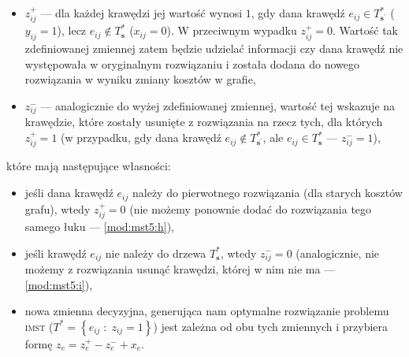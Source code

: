 \begin{itemize}
	\item $z_{ij}^{+}$ --- dla każdej krawędzi jej wartość wynosi $1$, gdy dana krawędź $e_{ij} \in T^{\ast}_{\textbf{s}^{\prime}}$ ($y_{ij} = 1$), lecz $e_{ij} \notin T^{\ast}_{\textbf{s}}$ ($x_{ij} = 0$). W przeciwnym wypadku $z_{ij}^{+} = 0$. Wartość tak zdefiniowanej zmiennej zatem będzie udzielać informacji czy dana krawędź nie występowała w oryginalnym rozwiązaniu i została dodana do nowego rozwiązania w wyniku zmiany kosztów w grafie,
	\item $z_{ij}^{-}$ --- analogicznie do wyżej zdefiniowanej zmiennej, wartość tej wskazuje na krawędzie, które zostały usunięte z rozwiązania na rzecz tych, dla których $z_{ij}^{+} = 1$ (w przypadku, gdy dana krawędź $e_{ij} \notin T^{\ast}_{\textbf{s}^{\prime}}$, ale $e_{ij} \in T^{\ast}_{\textbf{s}}$ --- $z_{ij}^{-} = 1$),
\end{itemize}
które mają następujące własności:
\begin{itemize}
	\item jeśli dana krawędź $e_{ij}$ należy do pierwotnego rozwiązania (dla starych kosztów grafu), wtedy $z_{ij}^{+} = 0$ (nie możemy ponownie dodać do rozwiązania tego samego łuku --- \ref{mod:mst5:h}),
	\item jeśli krawędź $e_{ij}$ nie należy do drzewa $T^{\ast}_{\textbf{s}}$, wtedy $z_{ij}^{-} = 0$ (analogicznie, nie możemy z rozwiązania usunąć krawędzi, której w nim nie ma --- \ref{mod:mst5:i}),
	\item nowa zmienna decyzyjna, generująca nam optymalne rozwiązanie problemu \textsc{imst} ($T^{\ast} = \left\{ e_{ij} \; : \; z_{ij} = 1 \right\}$) jest zależna od obu tych zmiennych i przybiera formę $z_{e} = z^{+}_{e} - z^{-}_{e} + x_{e}$.
\end{itemize}

